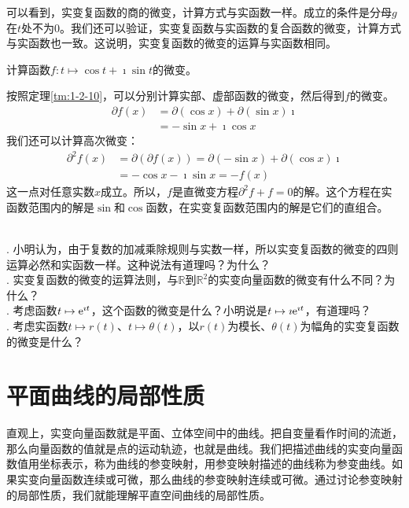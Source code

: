 \documentclass[12pt,UTF8]{ctexbook}
\begin{document}
可以看到，实变复函数的商的微变，计算方式与实函数一样。成立的条件是分母$g$在$t$处不为$0$。我们还可以验证，实变复函数与实函数的复合函数的微变，计算方式与实函数也一致。这说明，实变复函数的微变的运算与实函数相同。

\begin{et}
    计算函数$f: t\mapsto \cos{t} + \imath \sin{t}$的微变。
\end{et}

\begin{so}
    按照定理\ref{tm:1-2-10}，可以分别计算实部、虚部函数的微变，然后得到$f$的微变。
    \begin{align*}
        \partial f(x) &= \partial (\cos{x}) + \partial (\sin{x}) \imath \\
        &= -\sin{x} + \imath \cos{x}
    \end{align*}
    我们还可以计算高次微变：
    \begin{align*}
        \partial^2 f(x) &= \partial (\partial f(x)) = \partial (-\sin{x}) + \partial (\cos{x}) \imath \\
        &= -\cos{x} - \imath \sin{x} = -f(x)
    \end{align*}
    这一点对任意实数$x$成立。所以，$f$是直微变方程$\partial^2 f + f = 0$的解。这个方程在实函数范围内的解是$\sin$和$\cos$函数，在实变复函数范围内的解是它们的直组合。
\end{so}

\begin{sk}
    \mbox{}\\
    . 小明认为，由于复数的加减乘除规则与实数一样，所以实变复函数的微变的四则运算必然和实函数一样。这种说法有道理吗？为什么？\\
    . 实变复函数的微变的运算法则，与$\mathbb{R}$到$\mathbb{R}^2$的实变向量函数的微变有什么不同？为什么？\\
    . 考虑函数$t \mapsto \mathrm{e}^{\imath t}$，这个函数的微变是什么？小明说是$t \mapsto \imath \mathrm{e}^{\imath t}$，有道理吗？\\
    . 考虑实函数$t \mapsto r(t)$、$t \mapsto \theta(t)$，以$r(t)$为模长、$\theta(t)$为幅角的实变复函数的微变是什么？
\end{sk}

\section{平面曲线的局部性质}

直观上，实变向量函数就是平面、立体空间中的曲线。把自变量看作时间的流逝，那么向量函数的值就是点的运动轨迹，也就是曲线。我们把描述曲线的实变向量函数值用坐标表示，称为曲线的参变映射，用参变映射描述的曲线称为参变曲线。如果实变向量函数连续或可微，那么曲线的参变映射连续或可微。通过讨论参变映射的局部性质，我们就能理解平直空间曲线的局部性质。
\end{document}
